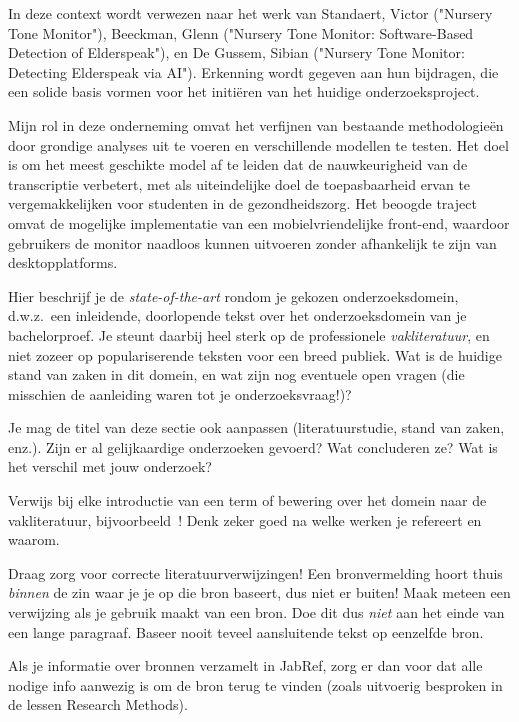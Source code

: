 In deze context wordt verwezen naar het werk van Standaert, Victor ("Nursery Tone Monitor"), Beeckman, Glenn ("Nursery Tone Monitor: Software-Based Detection of Elderspeak"), en De Gussem, Sibian ("Nursery Tone Monitor: Detecting Elderspeak via AI"). Erkenning wordt gegeven aan hun bijdragen, die een solide basis vormen voor het initiëren van het huidige onderzoeksproject.

Mijn rol in deze onderneming omvat het verfijnen van bestaande methodologieën door grondige analyses uit te voeren en verschillende modellen te testen. Het doel is om het meest geschikte model af te leiden dat de nauwkeurigheid van de transcriptie verbetert, met als uiteindelijke doel de toepasbaarheid ervan te vergemakkelijken voor studenten in de gezondheidszorg. Het beoogde traject omvat de mogelijke implementatie van een mobielvriendelijke front-end, waardoor gebruikers de monitor naadloos kunnen uitvoeren zonder afhankelijk te zijn van desktopplatforms.

Hier beschrijf je de \emph{state-of-the-art} rondom je gekozen onderzoeksdomein, d.w.z.\ een inleidende, doorlopende tekst over het onderzoeksdomein van je bachelorproef. Je steunt daarbij heel sterk op de professionele \emph{vakliteratuur}, en niet zozeer op populariserende teksten voor een breed publiek. Wat is de huidige stand van zaken in dit domein, en wat zijn nog eventuele open vragen (die misschien de aanleiding waren tot je onderzoeksvraag!)?

Je mag de titel van deze sectie ook aanpassen (literatuurstudie, stand van zaken, enz.). Zijn er al gelijkaardige onderzoeken gevoerd? Wat concluderen ze? Wat is het verschil met jouw onderzoek?

Verwijs bij elke introductie van een term of bewering over het domein naar de vakliteratuur, bijvoorbeeld~\autocite{Hykes2013}! Denk zeker goed na welke werken je refereert en waarom.

Draag zorg voor correcte literatuurverwijzingen! Een bronvermelding hoort thuis \emph{binnen} de zin waar je je op die bron baseert, dus niet er buiten! Maak meteen een verwijzing als je gebruik maakt van een bron. Doe dit dus \emph{niet} aan het einde van een lange paragraaf. Baseer nooit teveel aansluitende tekst op eenzelfde bron.

Als je informatie over bronnen verzamelt in JabRef, zorg er dan voor dat alle nodige info aanwezig is om de bron terug te vinden (zoals uitvoerig besproken in de lessen Research Methods).


